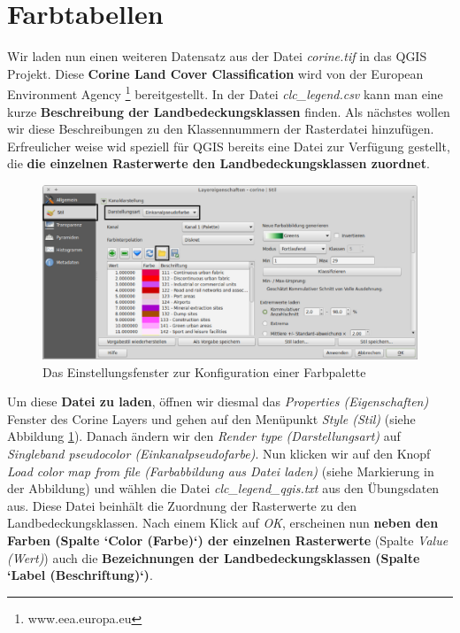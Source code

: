 \documentclass[a4paper,12pt,ngerman]{sphinxmanual}
\begin{document}
\section{Farbtabellen}
\label{uebung2:farbtabellen}
Wir laden nun einen weiteren Datensatz aus der Datei \emph{corine.tif} in das QGIS Projekt. Diese \textbf{Corine Land Cover Classification} wird von der European Environment Agency \footnote{
www.eea.europa.eu
} bereitgestellt. In der Datei \emph{clc\_legend.csv} kann man eine kurze \textbf{Beschreibung der Landbedeckungsklassen} finden.
Als nächstes wollen wir diese Beschreibungen zu den Klassennummern der Rasterdatei hinzufügen. Erfreulicher weise wid speziell für QGIS bereits eine Datei zur Verfügung gestellt, die \textbf{die einzelnen Rasterwerte den Landbedeckungsklassen zuordnet}.
\begin{figure}[htbp]
\centering
\capstart

\includegraphics{qgis_farbpalette.png}
\caption{Das Einstellungsfenster zur Konfiguration einer Farbpalette}\label{uebung2:figsfarbpalette}\end{figure}

Um diese \textbf{Datei zu laden}, öffnen wir diesmal das \emph{Properties (Eigenschaften)} Fenster des Corine Layers und gehen auf den Menüpunkt \emph{Style (Stil)} (siehe Abbildung \hyperref[uebung2:figsfarbpalette]{ \ref*{uebung2:figsfarbpalette}}).
Danach ändern wir den \emph{Render type (Darstellungsart)} auf \emph{Singleband pseudocolor (Einkanalpseudofarbe)}. Nun klicken wir auf den Knopf \emph{Load color map from file (Farbabbildung aus Datei laden)} (siehe Markierung in der Abbildung) und wählen die Datei \emph{clc\_legend\_qgis.txt} aus den Übungsdaten aus. Diese Datei beinhält die Zuordnung der Rasterwerte zu den Landbedeckungsklassen.
Nach einem Klick auf \emph{OK}, erscheinen nun \textbf{neben den Farben (Spalte {}`Color (Farbe){}`) der einzelnen Rasterwerte} (Spalte \emph{Value (Wert)}) auch die \textbf{Bezeichnungen der Landbedeckungsklassen (Spalte {}`Label (Beschriftung){}`)}.
\end{document}
